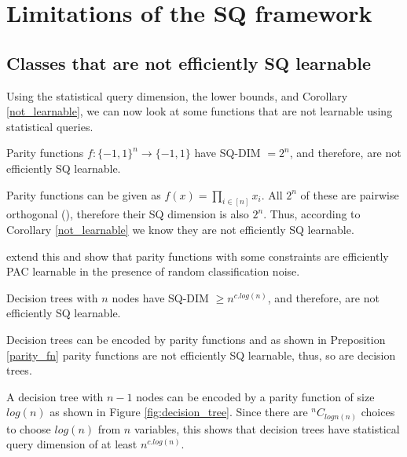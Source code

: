 \section{Limitations of the SQ framework}
\label{sec:limitations}

\subsection{Classes that are not efficiently SQ learnable}
Using the statistical query dimension, the lower bounds, and Corollary \ref{not_learnable}, we can now look at some functions that are not learnable using statistical queries.

\begin{proposition}
\label{parity_fn}
Parity functions $f: \{-1, 1\}^n \xrightarrow{} \{-1, 1\}$ have SQ-DIM $= 2^n$, and therefore, are not efficiently SQ learnable.
\end{proposition}

Parity functions can be given as $f(x) = \prod_{i \in [n]} x_i$. All $2^n$ of these are pairwise orthogonal (\cite{odonnell_analysis_2014}), therefore their SQ dimension is also $2^n$. Thus, according to Corollary \ref{not_learnable} we know they are not efficiently SQ learnable.

\cite{blum_noise-tolerant_2003} extend this and show that parity functions with some constraints are efficiently PAC learnable in the presence of random classification noise.

\begin{proposition}
Decision trees with $n$ nodes have SQ-DIM $\geq n^{c.log(n)}$, and therefore, are not efficiently SQ learnable.
\end{proposition}

Decision trees can be encoded by parity functions and as shown in Preposition \ref{parity_fn} parity functions are not efficiently SQ learnable, thus, so are decision trees.

A decision tree with $n-1$ nodes can be encoded by a parity function of size $log(n)$ as shown in Figure \ref{fig:decision_tree}. Since there are $^nC_{logn(n)}$ choices to choose $log(n)$ from $n$ variables, this shows that decision trees have statistical query dimension of at least $n^{c.log(n)}$.


